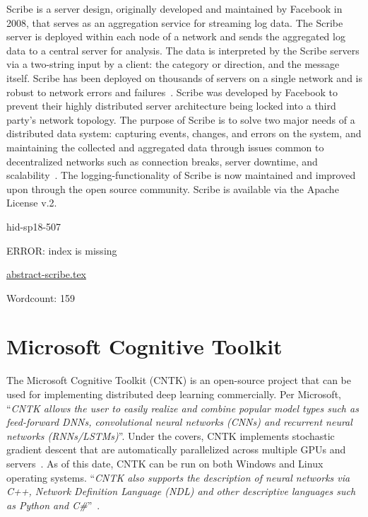 Scribe is a server design, originally developed and maintained by
Facebook in 2008, that serves as an aggregation service for streaming
log data. The Scribe server is deployed within each node of a network
and sends the aggregated log data to a central server for
analysis. The data is interpreted by the Scribe servers via a
two-string input by a client: the category or direction, and the
message itself. Scribe has been deployed on thousands of servers on a
single network and is robust to network errors and
failures~\cite{hid-sp18-507-FBScribe}. Scribe was developed by
Facebook to prevent their highly distributed server architecture being
locked into a third party's network topology. The purpose of Scribe is
to solve two major needs of a distributed data system: capturing
events, changes, and errors on the system, and maintaining the
collected and aggregated data through issues common to decentralized
networks such as connection breaks, server downtime, and
scalability~\cite{hid-sp18-507-ScribeNote}. The logging-functionality
of Scribe is now maintained and improved upon through the open source
community. Scribe is available via the Apache License v.2.


\begin{IU}

hid-sp18-507

ERROR: index is missing

\href{https://github.com/cloudmesh-community/hid-sp18-507/blob/master//technology/abstract-scribe.tex}{abstract-scribe.tex}

 

Wordcount: 159

\end{IU}

\section{Microsoft Cognitive Toolkit}

The Microsoft Cognitive Toolkit (CNTK) is an open-source project that
can be used for implementing distributed deep learning commercially.
Per Microsoft, \color{blue}``\emph{CNTK allows the user to easily realize and combine
popular model types such as feed-forward DNNs, convolutional neural
networks (CNNs) and recurrent neural networks (RNNs/LSTMs)}''\color{black}. Under the
covers, CNTK implements stochastic gradient descent that are
automatically parallelized across multiple GPUs and
servers~\cite{hid-sp18-510-web-cntk}. As of this date, CNTK can be run
on both Windows and Linux operating systems. \color{blue}``\emph{CNTK also supports the
description of neural networks via C++, Network Definition
Language (NDL) and other descriptive languages such as Python and
C\#}''\color{black}~\cite{hid-sp18-510-kd-cntk}.


